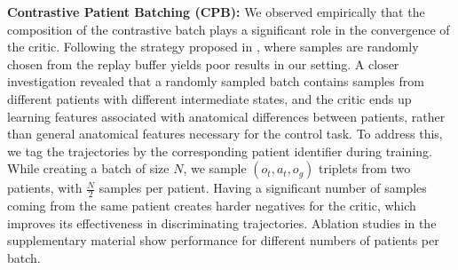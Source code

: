 \textbf{Contrastive Patient Batching (CPB):} We observed empirically that the composition of the contrastive batch plays a significant role in the convergence of the critic. Following the strategy proposed in \cite{Eysenbach2022ContrastiveLA}, where samples are randomly chosen from the replay buffer yields poor results in our setting. A closer investigation revealed that a randomly sampled batch contains samples from different patients with different intermediate states, and the critic ends up learning features associated with anatomical differences between patients, rather than general anatomical features necessary for the control task. To address this, we tag the trajectories by the corresponding patient identifier during training. While creating a  batch of size $N$, we sample $(o_t, a_t, o_g)$ triplets from two patients, with $\frac{N}{2}$ samples per patient. Having a significant number of samples coming from the same patient creates harder negatives for the critic, which improves its effectiveness in discriminating trajectories. Ablation studies in the supplementary material show performance for different numbers of patients per batch.

